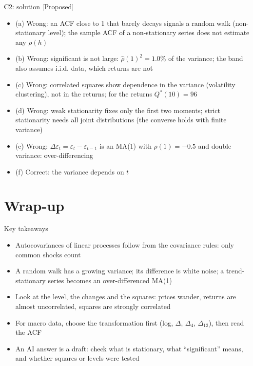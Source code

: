 \ifsolutions
\begin{frame}{C2: solution [Proposed]}
\itemsize{\scriptsize}
\begin{itemize}
    \item (a) Wrong: an ACF close to 1 that barely decays signals a random walk (non-stationary level); the sample ACF of a non-stationary series does not estimate any $\rho(h)$
    \item (b) Wrong: significant is not large: $\hat\rho(1)^2 = 1.0\%$ of the variance; the band also assumes i.i.d. data, which returns are not
    \item (c) Wrong: correlated squares show dependence in the variance (volatility clustering), not in the returns; for the returns $Q^*(10) = 96$
    \item (d) Wrong: weak stationarity fixes only the first two moments; strict stationarity needs all joint distributions (the converse holds with finite variance)
    \item (e) Wrong: $\Delta\varepsilon_t = \varepsilon_t - \varepsilon_{t-1}$ is an MA(1) with $\rho(1) = -0.5$ and double variance: over-differencing
    \item (f) Correct: the variance depends on $t$
\end{itemize}
\end{frame}
\fi


\section{Wrap-up}

\begin{frame}{Key takeaways}
\itemsize{\small}
\begin{itemize}
    \item Autocovariances of linear processes follow from the covariance rules: only common shocks count
    \item A random walk has a growing variance; its difference is white noise; a trend-stationary series becomes an over-differenced MA(1)
    \item Look at the level, the changes and the squares: prices wander, returns are almost uncorrelated, squares are strongly correlated
    \item For macro data, choose the transformation first (log, $\Delta$, $\Delta_4$, $\Delta_{12}$), then read the ACF
    \item An AI answer is a draft: check what is stationary, what ``significant'' means, and whether squares or levels were tested
\end{itemize}
\end{frame}


